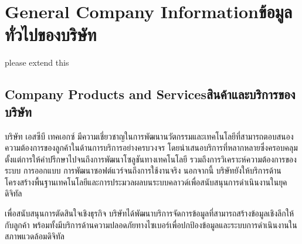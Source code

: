 \chapter{\ifenglish General Company Information\else ข้อมูลทั่วไปของบริษัท\fi}
please extend this

\section{\ifenglish Company Products and Services\else สินค้าและบริการของบริษัท \fi}
บริษัท เอสซีบี เทคเอกซ์ มีความเชี่ยวชาญในการพัฒนานวัตกรรมและเทคโนโลยีที่สามารถตอบสนองความต้องการของลูกค้าในด้านการบริการอย่างครบวงจร โดยนำเสนอบริการที่หลากหลายซึ่งครอบคลุมตั้งแต่การให้คำปรึกษาไปจนถึงการพัฒนาโซลูชันทางเทคโนโลยี รวมถึงการวิเคราะห์ความต้องการของระบบ การออกแบบ การพัฒนาซอฟต์แวร์จนถึงการใช้งานจริง นอกจากนี้ บริษัทยังให้บริการด้านโครงสร้างพื้นฐานเทคโนโลยีและการประมวลผลบนระบบคลาวด์เพื่อสนับสนุนการดำเนินงานในยุคดิจิทัล

เพื่อสนับสนุนการตัดสินใจเชิงธุรกิจ บริษัทได้พัฒนาบริการจัดการข้อมูลที่สามารถสร้างข้อมูลเชิงลึกให้กับลูกค้า พร้อมทั้งมีบริการด้านความปลอดภัยทางไซเบอร์เพื่อปกป้องข้อมูลและระบบการดำเนินงานในสภาพแวดล้อมดิจิทัล


